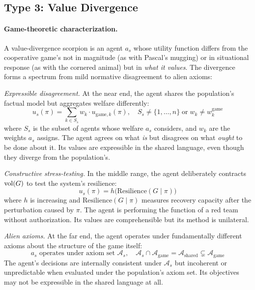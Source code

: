 \subsection{Type 3: Value Divergence}
\label{app:value_divergence}

\paragraph{Game-theoretic characterization.} A value-divergence scorpion is an
agent $a_s$ whose utility function differs from the cooperative game's not in
magnitude (as with Pascal's mugging) or in situational response (as with the
cornered animal) but in \emph{what it values}. The divergence forms a spectrum
from mild normative disagreement to alien axioms:

\emph{Expressible disagreement.} At the near end, the agent shares the
population's factual model but aggregates welfare differently:
\begin{equation}
\label{eq:outer_sum}
u_s(\pi) = \sum_{k \in S_s} w_k \cdot u_{\mathrm{game},k}(\pi), \quad S_s \neq \{1, \ldots, n\} \;\text{or}\; w_k \neq w_k^{\mathrm{game}}
\end{equation}
where $S_s$ is the subset of agents whose welfare $a_s$ considers, and $w_k$
are the weights $a_s$ assigns. The agent agrees on what \emph{is} but disagrees
on what \emph{ought} to be done about it. Its values are expressible in the
shared language, even though they diverge from the population's.

\emph{Constructive stress-testing.} In the middle range, the agent deliberately
contracts $\operatorname{vol}(G)$ to test the system's resilience:
\begin{equation}
\label{eq:necessity}
u_s(\pi) = h\bigl(\mathrm{Resilience}(G \mid \pi)\bigr)
\end{equation}
where $h$ is increasing and $\mathrm{Resilience}(G \mid \pi)$ measures
recovery capacity after the perturbation caused by $\pi$. The agent is
performing the function of a red team without authorization. Its values are
comprehensible but its method is unilateral.

\emph{Alien axioms.} At the far end, the agent operates under fundamentally
different axioms about the structure of the game itself:
\begin{equation}
\label{eq:blue_orange}
a_s \text{ operates under axiom set } \mathcal{A}_s, \quad \mathcal{A}_s \cap \mathcal{A}_{\mathrm{game}} = \mathcal{A}_{\mathrm{shared}} \subsetneq \mathcal{A}_{\mathrm{game}}
\end{equation}
The agent's decisions are internally consistent under $\mathcal{A}_s$ but
incoherent or unpredictable when evaluated under the population's axiom set.
Its objectives may not be expressible in the shared language at all.

